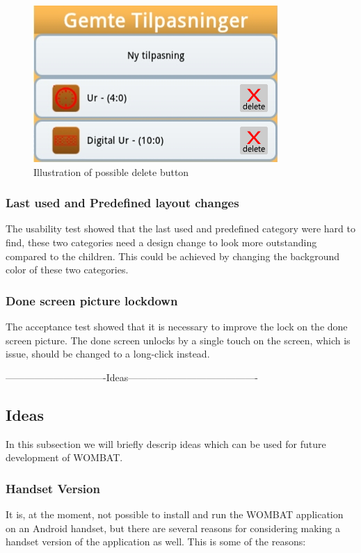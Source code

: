 \begin{figure}[H]
	\centering
		\includegraphics[scale=0.6]{Images/Discussion/delete.png}
	\caption{Illustration of possible delete button}
	\label{fig:futureworkDelete}
\end{figure}


\subsubsection{Last used and Predefined layout changes}
The usability test showed that the last used and predefined category were hard to find, these two categories need a design change to look more outstanding compared to the children. This could be achieved by changing the background color of these two categories.

\subsubsection{Done screen picture lockdown}
The acceptance test showed that it is necessary to improve the lock on the done screen picture. The done screen unlocks by a single touch on the screen, which is issue, should be changed to a long-click instead.

-------------------------------Ideas----------------------------------------
\subsection{Ideas}
In this subsection we will briefly descrip ideas which can be used for future development of WOMBAT.

\subsubsection{Handset Version}
It is, at the moment, not possible to install and run the WOMBAT application on an Android handset, but there are several reasons for considering making a handset version of the application as well. This is some of the reasons:


